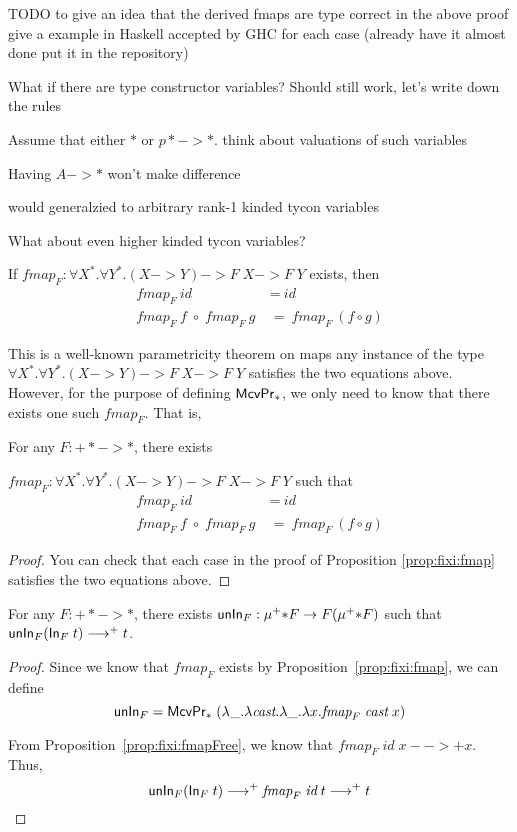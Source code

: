 TODO to give an idea that the derived fmaps are type correct in the above
proof give a example in Haskell accepted by GHC for each case
(already have it almost done put it in the repository)

What if there are type constructor variables?
Should still work, let's write down the rules


Assume that either $*$ or $p* -> *$.
think about valuations of such variables

Having $A -> *$ won't make difference

would generalzied to arbitrary rank-1 kinded tycon variables


What about even higher kinded tycon variables?


\begin{proposition}\label{prop:fixi:fmapFree}
If $\textit{fmap}_F:\forall X^{*}.\forall Y^{*}.(X -> Y) -> F\;X -> F\;Y$
exists, then
\begin{align*}
\textit{fmap}_F~\textit{id} &~=~ \textit{id} \\
\textit{fmap}_F~\textit{f} \;\circ\; \textit{fmap}_F~\textit{g}
&~=~ \textit{fmap}_F~(f\circ g)
\end{align*}
\end{proposition}\noindent
This is a well-known parametricity theorem on maps any instance of the type
$\forall X^{*}.\forall Y^{*}.(X -> Y) -> F\;X -> F\;Y$ satisfies
the two equations above. However, for the purpose of defining $\mathsf{McvPr}_{*}$,
we only need to know that there exists one such $\textit{fmap}_F$. That is,
\begin{proposition}\label{prop:fixi:fmapHom}
For any $F : +* -> *$, there exists

$\textit{fmap}_F:\forall X^{*}.\forall Y^{*}.(X -> Y) -> F\;X -> F\;Y$
such that
\begin{align*}
\textit{fmap}_F~\textit{id} &~=~ \textit{id} \\
\textit{fmap}_F~\textit{f} \;\circ\; \textit{fmap}_F~\textit{g}
&~=~ \textit{fmap}_F~(f\circ g)
\end{align*}
\end{proposition}
\begin{proof}
	You can check that each case
	in the proof of Proposition \ref{prop:fixi:fmap}
	satisfies the two equations above.
\end{proof}

\begin{proposition} For any $F : +* -> *$, there exists
$\mathsf{unIn}_F : \mu^{+}{*} F -> F(\mu^{+}{*} F)$ such that
$\mathsf{unIn}_F (\mathsf{In}_F\;t) -->+ t$.
\end{proposition}
\begin{proof}
Since we know that $\textit{fmap}_F$ exists by Proposition~\ref{prop:fixi:fmap},
we can define
\[ \mathsf{unIn}_F = \mathsf{McvPr}_{*}\;
            (\lambda\_.\lambda\textit{cast}.\lambda\_.\lambda x.\textit{fmap}_F\;\textit{cast}\;x)
\]

From Proposition~\ref{prop:fixi:fmapFree}, we know that
$\textit{fmap}_F\;\textit{id}\;x -->+ x$.
Thus,
\[ \mathsf{unIn}_F (\mathsf{In}_F\;t) -->+ \textit{fmap}_F\;\textit{id}\;t -->+ t \]
\end{proof}

